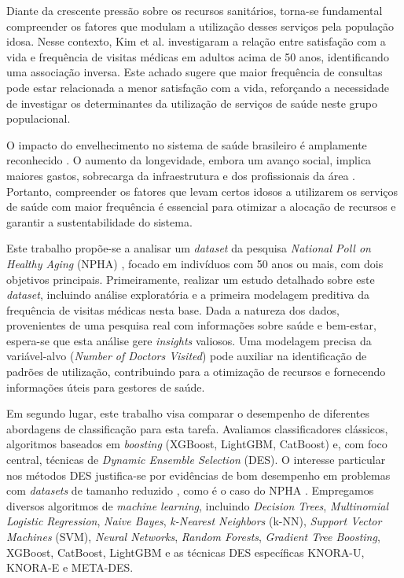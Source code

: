 \documentclass[12pt]{article}
\begin{document}
Diante da crescente pressão sobre os recursos sanitários, torna-se fundamental compreender os fatores que modulam a utilização desses serviços pela população idosa. Nesse contexto, Kim et al. \cite{KPSSP2014} investigaram a relação entre satisfação com a vida e frequência de visitas médicas em adultos acima de 50 anos, identificando uma associação inversa. Este achado sugere que maior frequência de consultas pode estar relacionada a menor satisfação com a vida, reforçando a necessidade de investigar os determinantes da utilização de serviços de saúde neste grupo populacional.

O impacto do envelhecimento no sistema de saúde brasileiro é amplamente reconhecido \cite{LidiaMota2022, mrejen2023envelhecimento}. O aumento da longevidade, embora um avanço social, implica maiores gastos, sobrecarga da infraestrutura e dos profissionais da área \cite{LidiaMota2022, mrejen2023envelhecimento}. Portanto, compreender os fatores que levam certos idosos a utilizarem os serviços de saúde com maior frequência é essencial para otimizar a alocação de recursos e garantir a sustentabilidade do sistema.

Este trabalho propõe-se a analisar um \textit{dataset} da pesquisa \textit{National Poll on Healthy Aging} (NPHA) \cite{NPHA2017}, focado em indivíduos com 50 anos ou mais, com dois objetivos principais. Primeiramente, realizar um estudo detalhado sobre este \textit{dataset}, incluindo análise exploratória e a primeira modelagem preditiva da frequência de visitas médicas nesta base. Dada a natureza dos dados, provenientes de uma pesquisa real com informações sobre saúde e bem-estar, espera-se que esta análise gere \textit{insights} valiosos. Uma modelagem precisa da variável-alvo (\textit{Number of Doctors Visited}) pode auxiliar na identificação de padrões de utilização, contribuindo para a otimização de recursos e fornecendo informações úteis para gestores de saúde.

Em segundo lugar, este trabalho visa comparar o desempenho de diferentes abordagens de classificação para esta tarefa. Avaliamos classificadores clássicos, algoritmos baseados em \textit{boosting} (XGBoost, LightGBM, CatBoost) e, com foco central, técnicas de \textit{Dynamic Ensemble Selection} (DES). O interesse particular nos métodos DES justifica-se por evidências de bom desempenho em problemas com \textit{datasets} de tamanho reduzido \cite{Cruz_2015}, como é o caso do NPHA \cite{ICPRAI2018SI}. Empregamos diversos algoritmos de \textit{machine learning}, incluindo \textit{Decision Trees}, \textit{Multinomial Logistic Regression}, \textit{Naive Bayes}, \textit{k-Nearest Neighbors} (k-NN), \textit{Support Vector Machines} (SVM), \textit{Neural Networks}, \textit{Random Forests}, \textit{Gradient Tree Boosting}, XGBoost, CatBoost, LightGBM e as técnicas DES específicas KNORA-U, KNORA-E e META-DES.
\end{document}
